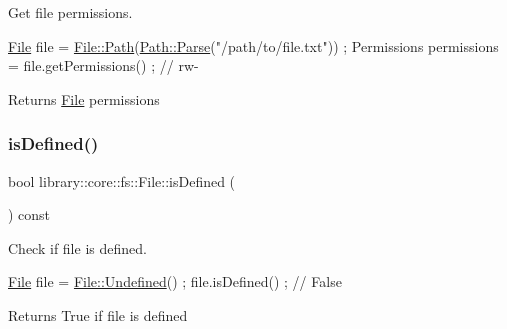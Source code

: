 Get file permissions. 


\begin{DoxyCode}
\hyperlink{classlibrary_1_1core_1_1fs_1_1_file_a7490060f19a21d4ee58bb6cec87a1ca6}{File} file = \hyperlink{classlibrary_1_1core_1_1fs_1_1_file_a0e0d8a8becb3cdd21775554e181452d8}{File::Path}(\hyperlink{classlibrary_1_1core_1_1fs_1_1_path_aebf5bd3af83e0b7376616e146f3e55df}{Path::Parse}(\textcolor{stringliteral}{"/path/to/file.txt"})) ;
Permissions permissions = file.getPermissions() ; \textcolor{comment}{// rw-}
\end{DoxyCode}


\begin{DoxyReturn}{Returns}
\hyperlink{classlibrary_1_1core_1_1fs_1_1_file}{File} permissions 
\end{DoxyReturn}
\mbox{\label{classlibrary_1_1core_1_1fs_1_1_file_a2044eecd956aaf55b4c55872485e1bf9}} 
\subsubsection{\texorpdfstring{is\+Defined()}{isDefined()}}
{\footnotesize\ttfamily bool library\+::core\+::fs\+::\+File\+::is\+Defined (\begin{DoxyParamCaption}{ }\end{DoxyParamCaption}) const}



Check if file is defined. 


\begin{DoxyCode}
\hyperlink{classlibrary_1_1core_1_1fs_1_1_file_a7490060f19a21d4ee58bb6cec87a1ca6}{File} file = \hyperlink{classlibrary_1_1core_1_1fs_1_1_file_a985adb1a33b94dcdbed2792651eb81af}{File::Undefined}() ;
file.isDefined() ; \textcolor{comment}{// False}
\end{DoxyCode}


\begin{DoxyReturn}{Returns}
True if file is defined 
\end{DoxyReturn}
\mbox{\label{classlibrary_1_1core_1_1fs_1_1_file_ac81efdfeb17ea50abe23d96f69bc15ae}} 
